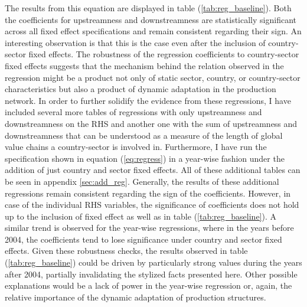 The results from this equation are displayed in table (\ref{tab:reg_baseline}). Both the coefficients for upstreamness and downstreamness 
are statistically significant across all fixed effect specifications and remain consistent regarding their sign. An interesting observation 
is that this is the case even after the inclusion of country-sector fixed effects.  The robustness of the regression coefficients to 
country-sector fixed effects suggests that the mechanism behind the relation observed in the regression might be a product not only of 
static sector, country, or country-sector characteristics but also a product of dynamic adaptation in the production network. In order to 
further solidify the evidence from these regressions, I have included several more tables of regressions with only upstreamness and 
downstreamness on the RHS and another one with the sum of upstreamness and downstreamness that can be understood as a measure of the length 
of global value chains a country-sector is involved in. Furthermore, I have run the specification shown in equation (\ref{eq:regress}) in a 
year-wise fashion under the addition of just country and sector fixed effects. All of these additional tables can be seen in appendix 
\ref{sec:add_reg}. Generally, the results of these additional regressions remain consistent regarding the sign of the coefficients. However, 
in case of the individual RHS variables, the significance of coefficients does not hold up to the inclusion of fixed effect as well as in 
table (\ref{tab:reg_baseline}). A similar trend is observed for the year-wise regressions, where in the years before 2004, the coefficients tend to lose 
significance under country and sector fixed effects. Given these robustness checks, the results observed in table (\ref{tab:reg_baseline}) could be 
driven by particularly strong values during the years after 2004, partially invalidating the stylized facts presented here. Other possible 
explanations would be a lack of power in the year-wise regression or, again, the relative importance of the dynamic adaptation of production structures. 




